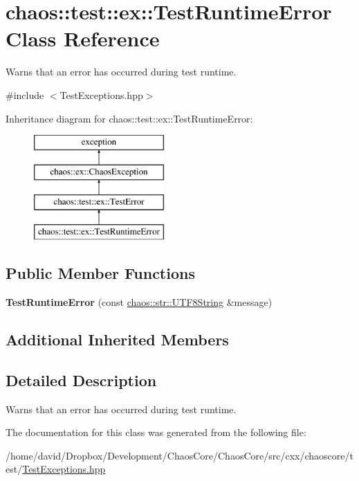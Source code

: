 \hypertarget{classchaos_1_1test_1_1ex_1_1_test_runtime_error}{\section{chaos\-:\-:test\-:\-:ex\-:\-:Test\-Runtime\-Error Class Reference}
\label{classchaos_1_1test_1_1ex_1_1_test_runtime_error}
}


Warns that an error has occurred during test runtime.  




{\ttfamily \#include $<$Test\-Exceptions.\-hpp$>$}

Inheritance diagram for chaos\-:\-:test\-:\-:ex\-:\-:Test\-Runtime\-Error\-:\begin{figure}[H]
\begin{center}
\leavevmode
\includegraphics[height=4.000000cm]{classchaos_1_1test_1_1ex_1_1_test_runtime_error}
\end{center}
\end{figure}
\subsection*{Public Member Functions}
\begin{DoxyCompactItemize}
\item 
\hypertarget{classchaos_1_1test_1_1ex_1_1_test_runtime_error_a7ebdd71d1296663a844aefd8e409766e}{{\bfseries Test\-Runtime\-Error} (const \hyperlink{classchaos_1_1str_1_1_u_t_f8_string}{chaos\-::str\-::\-U\-T\-F8\-String} \&message)}\label{classchaos_1_1test_1_1ex_1_1_test_runtime_error_a7ebdd71d1296663a844aefd8e409766e}

\end{DoxyCompactItemize}
\subsection*{Additional Inherited Members}


\subsection{Detailed Description}
Warns that an error has occurred during test runtime. 

The documentation for this class was generated from the following file\-:\begin{DoxyCompactItemize}
\item 
/home/david/\-Dropbox/\-Development/\-Chaos\-Core/\-Chaos\-Core/src/cxx/chaoscore/test/\hyperlink{_test_exceptions_8hpp}{Test\-Exceptions.\-hpp}\end{DoxyCompactItemize}
